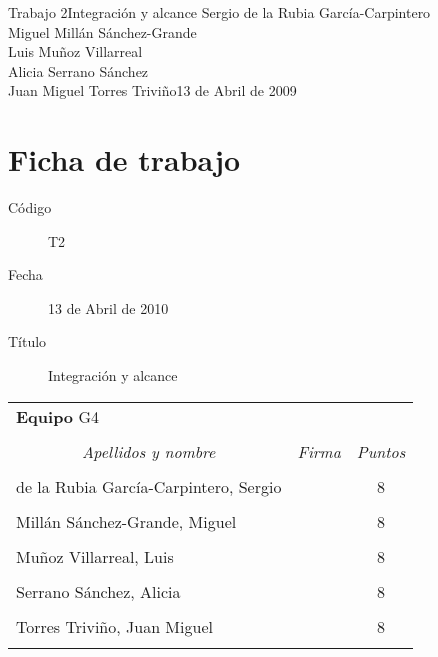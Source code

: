 \documentclass[11pt,a4paper,spanish,twoside]{report}
\begin{document}


{Trabajo 2}{Integración y alcance}
{Sergio de la Rubia García-Carpintero\\Miguel Millán Sánchez-Grande\\
  Luis Muñoz Villarreal\\Alicia Serrano Sánchez\\
  Juan Miguel Torres Triviño}{13 de Abril de 2009}


\chapter*{Ficha de trabajo}
\begin{description}
\item[Código] T2
\item[Fecha] 13 de Abril de 2010
\item[Título] Integración y alcance
\end{description}

\begin{table}[!ht]
  \centering
  \begin{tabular}{lp{5cm}c}
    \multicolumn{3}{l}{\Large \textbf{Equipo} G4} \\ \\
    \multicolumn{1}{c}{\emph{Apellidos y nombre}} & 
    \multicolumn{1}{c}{\emph{Firma}} & \emph{Puntos} \\
    \hline \\
    de la Rubia García-Carpintero, Sergio & & 8 \\ \\
    Millán Sánchez-Grande, Miguel         & & 8 \\ \\
    Muñoz Villarreal, Luis                & & 8 \\ \\
    Serrano Sánchez, Alicia               & & 8 \\ \\
    Torres Triviño, Juan Miguel           & & 8 \\ \\
    \hline
  \end{tabular}
\end{table}
\end{document}
